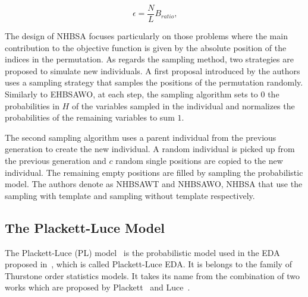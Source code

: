 \begin{equation*}
    \epsilon = \frac{N}{L}B_{ratio} \text{,}
\end{equation*}

The design of NHBSA focuses particularly on those problems where the main contribution to the objective function is given by the absolute position of the indices in the permutation. As regards the sampling method, two strategies are proposed to simulate new individuals. A first proposal introduced by the authors uses a sampling strategy that samples the positions of the permutation randomly. Similarly to EHBSAWO, at each step, the sampling algorithm sets to $0$ the probabilities in $H$ of the variables sampled in the individual and normalizes the probabilities of the remaining variables to sum $1$. %
%    

The second sampling algorithm uses a parent individual from the previous generation to create the new individual. A random individual is picked up from the previous generation and $c$ random single positions are copied to the new individual. The remaining empty positions are filled by sampling the probabilistic model. The authors denote as NHBSAWT and NHBSAWO,  NHBSA that use the sampling with template and sampling without template respectively.

\subsection{The Plackett-Luce Model}
The Plackett-Luce (PL) model~\citep{marden1996analyzing} is the probabilistic model used in the EDA proposed in~\citep{ceberio2013plackett}, which is called Plackett-Luce EDA. It is belongs to the family of Thurstone order statistics models. It takes its name from the combination of two works which are proposed by Plackett~\citep{plackett1975analysis} and Luce~\citep{luce2005individual}\citep{plackett1975analysis}. 

